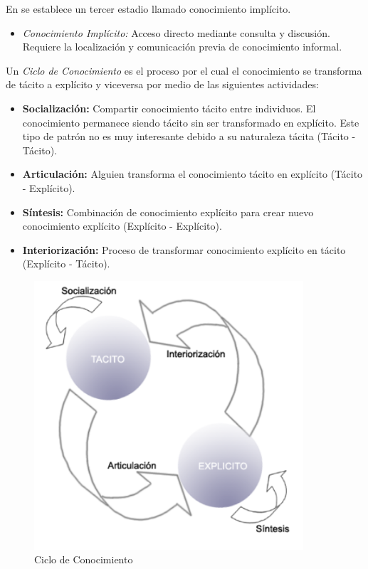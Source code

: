 En \cite{liebowitz1998} se establece un tercer estadio llamado conocimiento implícito.

\begin{itemize}
\item \textit{Conocimiento Implícito:} Acceso directo mediante consulta y discusión. Requiere la localización y comunicación previa de conocimiento informal.
\end{itemize}

Un \textit{Ciclo de Conocimiento} es el proceso por el cual el conocimiento se transforma de tácito a explícito y viceversa por medio de las siguientes actividades:

\begin{itemize}
\item \textbf{Socialización:} Compartir conocimiento tácito entre individuos. El conocimiento permanece siendo tácito sin ser transformado en explícito. Este tipo de patrón no es muy interesante debido a su naturaleza tácita (Tácito - Tácito).

\item \textbf{Articulación:} Alguien transforma el conocimiento tácito en explícito (Tácito - Explícito).

\item \textbf{Síntesis:} Combinación de conocimiento explícito para crear nuevo conocimiento explícito  (Explícito - Explícito).
 
\item \textbf{Interiorización:} Proceso de transformar conocimiento explícito en tácito (Explícito - Tácito).
\end{itemize}

\begin{figure}
 \centering
 \includegraphics[width=100mm]{Ciclo_Conocimiento.png}
 \caption{Ciclo de Conocimiento}
 \label{ciclo_conocimiento}
\end{figure}

